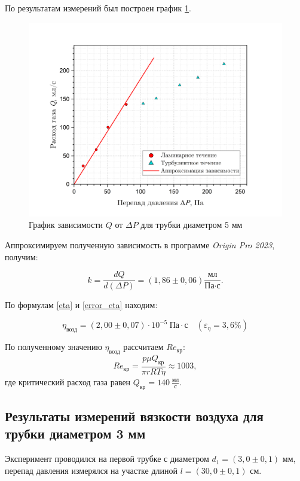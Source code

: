 \documentclass[a4paper, 12pt]{article}
\begin{document}
    \noindent По результатам измерений был построен график \ref{p(q)_5mm}.

    \begin{figure}[H]
        \centering
        \includegraphics[width = 15cm]{images/graph_5mm.png}
        \caption{График зависимости $Q$ от $\Delta P$ для трубки диаметром 5 мм}
        \label{p(q)_5mm}
    \end{figure}

    \noindent Аппроксимируем полученную зависимость в программе \textit{Origin Pro 2023}, получим:
    
    \[ k = \frac{dQ}{d(\Delta P)} = \left(1,86 \pm 0,06\right) \frac{\text{мл}}{\text{Па} \cdot \text{с}}.\]

    \noindent По формулам \ref{eta} и \ref{error_eta} находим:

    \[ \boxed{\eta_\text{возд} = \left(2,00 \pm 0,07\right) \cdot 10^{-5} \: \text{Па}\cdot \text{с} \quad \left( \varepsilon_{\eta} = 3,6 \% \right)} \]

    \noindent По полученному значению $\eta_\text{возд}$ рассчитаем $Re_\text{кр}$: \[ Re_\text{кр} = \frac{p\mu Q_\text{кр}}{\pi r RT\eta} \approx 1003, \] где критический расход газа равен $Q_\text{кр} = 140 \: \frac{\text{мл}}{\text{с}}$.

    \subsection*{Результаты измерений вязкости воздуха для трубки диаметром 3 мм}

    \noindent Эксперимент проводился на первой трубке с диаметром $d_1 = \left( 3,0 \pm 0,1 \right)$ мм, перепад давления измерялся на участке длиной $l = \left(30,0 \pm 0,1 \right)$ см. 
\end{document}
